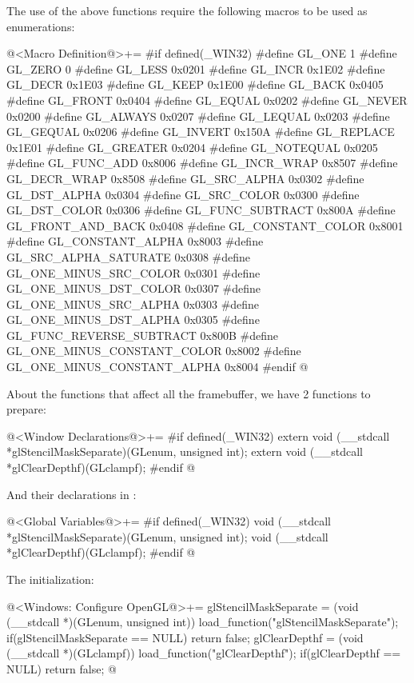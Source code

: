 The use of the above functions require the following macros to be used
as enumerations:

\iniciocodigo
@<Macro Definition@>+=
#if defined(_WIN32)
#define GL_ONE                      1
#define GL_ZERO                     0
#define GL_LESS                     0x0201
#define GL_INCR                     0x1E02
#define GL_DECR                     0x1E03
#define GL_KEEP                     0x1E00
#define GL_BACK                     0x0405
#define GL_FRONT                    0x0404
#define GL_EQUAL                    0x0202
#define GL_NEVER                    0x0200
#define GL_ALWAYS                   0x0207
#define GL_LEQUAL                   0x0203
#define GL_GEQUAL                   0x0206
#define GL_INVERT                   0x150A
#define GL_REPLACE                  0x1E01
#define GL_GREATER                  0x0204
#define GL_NOTEQUAL                 0x0205
#define GL_FUNC_ADD                 0x8006
#define GL_INCR_WRAP                0x8507
#define GL_DECR_WRAP                0x8508
#define GL_SRC_ALPHA                0x0302
#define GL_DST_ALPHA                0x0304
#define GL_SRC_COLOR                0x0300
#define GL_DST_COLOR                0x0306
#define GL_FUNC_SUBTRACT            0x800A
#define GL_FRONT_AND_BACK           0x0408
#define GL_CONSTANT_COLOR           0x8001
#define GL_CONSTANT_ALPHA           0x8003
#define GL_SRC_ALPHA_SATURATE	    0x0308
#define GL_ONE_MINUS_SRC_COLOR      0x0301
#define GL_ONE_MINUS_DST_COLOR      0x0307
#define GL_ONE_MINUS_SRC_ALPHA      0x0303
#define GL_ONE_MINUS_DST_ALPHA      0x0305
#define GL_FUNC_REVERSE_SUBTRACT    0x800B
#define GL_ONE_MINUS_CONSTANT_COLOR 0x8002
#define GL_ONE_MINUS_CONSTANT_ALPHA 0x8004
#endif
@
\fimcodigo

About the functions that affect all the framebuffer, we have 2
functions to prepare:

\iniciocodigo
@<Window Declarations@>+=
#if defined(_WIN32)
extern void (__stdcall *glStencilMaskSeparate)(GLenum, unsigned int);
extern void (__stdcall *glClearDepthf)(GLclampf);
#endif
@
\fimcodigo

And their declarations in :

\iniciocodigo
@<Global Variables@>+=
#if defined(_WIN32)
void (__stdcall *glStencilMaskSeparate)(GLenum, unsigned int);
void (__stdcall *glClearDepthf)(GLclampf);
#endif
@
\fimcodigo

The initialization:

\iniciocodigo
@<Windows: Configure OpenGL@>+=
glStencilMaskSeparate = (void (__stdcall *)(GLenum, unsigned int))
                            load_function("glStencilMaskSeparate");
if(glStencilMaskSeparate == NULL) return false;
glClearDepthf = (void (__stdcall *)(GLclampf)) load_function("glClearDepthf");
if(glClearDepthf == NULL) return false;
@
\fimcodigo

